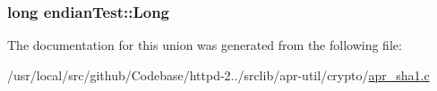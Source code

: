\subsubsection[{\texorpdfstring{Long}{Long}}]{\setlength{\rightskip}{0pt plus 5cm}long endian\+Test\+::\+Long}\hypertarget{unionendianTest_a671978d0955d8687cf57a7a29bae22d3}{}\label{unionendianTest_a671978d0955d8687cf57a7a29bae22d3}


The documentation for this union was generated from the following file\+:\begin{DoxyCompactItemize}
\item 
/usr/local/src/github/\+Codebase/httpd-\/2../srclib/apr-\/util/crypto/\hyperlink{apr__sha1_8c}{apr\+\_\+sha1.\+c}\end{DoxyCompactItemize}
